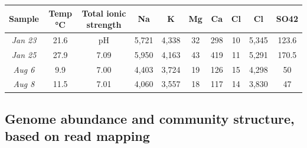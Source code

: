\begin{table}
\ContinuedFloat
\captionsetup{labelformat=empty}
\centering

\begin{tabular}{cccccccccc}

\textbf{Sample} & \textbf{Temp \si{\degreeCelsius}} & \textbf{Total ionic strength} & \textbf{Na} & \textbf{K} & \textbf{Mg} & \textbf{Ca} & \textbf{Cl} & \textbf{Cl} & \textbf{SO42} \\
\hline
\textit{Jan 23} & 21.6 & pH & 5,721 & 4,338 & 32 & 298 & 10 & 5,345 & 123.6 \\
\textit{Jan 25} & 27.9 & 7.09 & 5,950 & 4,163 & 43 & 419 & 11 & 5,291 & 170.5 \\
\textit{Aug 6} & 9.9 & 7.00 & 4,403 & 3,724 & 19 & 126 & 15 & 4,298 & 50 \\
\textit{Aug 8} & 11.5 & 7.01 & 4,060 & 3,557 & 18 & 117 & 14 & 3,830 & 47 \\

\end{tabular}
\end{table}


\clearpage
\subsection{Genome abundance and community structure, based on read mapping}

